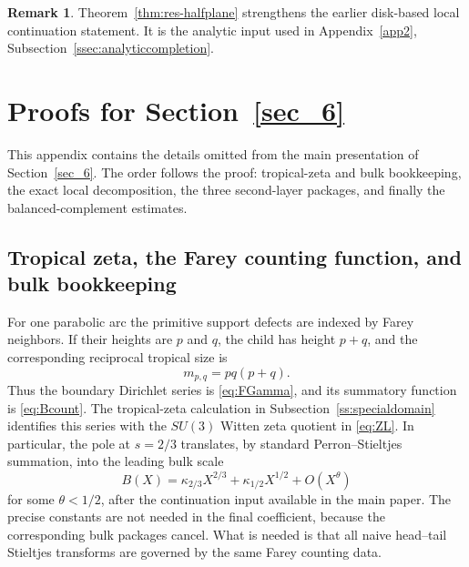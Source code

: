 \documentclass[a4paper,american,11pt]{amsart}
\theoremstyle{plain}
\theoremstyle{definition}
\newtheorem{remark}[theorem]{Remark}
\begin{document}
\begin{remark}
Theorem~\ref{thm:res-halfplane} strengthens the earlier disk-based local continuation
statement. It is the analytic input used in Appendix~\ref{app2},
Subsection~\ref{ssec:analyticcompletion}.
\end{remark}
\section{Proofs for Section~\ref{sec_6}}\label{app:section6}

This appendix contains the details omitted from the main presentation of
Section~\ref{sec_6}. The order follows the proof: tropical-zeta and bulk
bookkeeping, the exact local decomposition, the three second-layer packages,
and finally the balanced-complement estimates.

\subsection{Tropical zeta, the Farey counting function, and bulk bookkeeping}

For one parabolic arc the primitive support defects are indexed by Farey
neighbors.  If their heights are \(p\) and \(q\), the child has height
\(p+q\), and the corresponding reciprocal tropical size is
\[
 m_{p,q}=pq(p+q).
\]
Thus the boundary Dirichlet series is \eqref{eq:FGamma}, and its summatory
function is \eqref{eq:Bcount}.  The tropical-zeta calculation in
Subsection~\ref{ss:specialdomain} identifies this series with the
\(SU(3)\) Witten zeta quotient in \eqref{eq:ZL}.  In particular, the pole at
\(s=2/3\) translates, by standard Perron--Stieltjes summation, into the
leading bulk scale
\begin{equation}\label{eq:BExpansion}
 B(X)=\kappa_{2/3}X^{2/3}+\kappa_{1/2}X^{1/2}+O(X^\theta)
\end{equation}
for some \(\theta<1/2\), after the continuation input available in the main
paper.  The precise constants are not needed in the final coefficient, because
the corresponding bulk packages cancel.  What is needed is that all naive
head--tail Stieltjes transforms are governed by the same Farey counting data.
\end{document}
